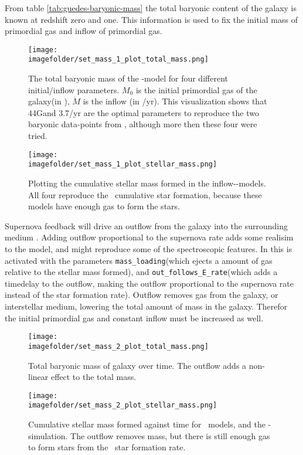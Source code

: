 
From table \ref{tab:guedes-baryonic-mass} the total baryonic content of the galaxy is known at redshift zero and one. This information is used to fix the initial mass of primordial gas and inflow of primordial gas. 


\begin{figure}[h]
  \centering
  \texttt{[image: \\imagefolder/set\_mass\_1\_plot\_total\_mass.png]}
  \caption{\label{fig:fit-v1-1-total}
    The total baryonic mass of the \omegamodel-model for four different initial/inflow parameters.
    $M_0$ is the initial primordial gas of the galaxy(in \msol), $\dot{M}$ is the inflow (in \msol/yr).
    This visualization shows that 44G\msol and 3.7\msol/yr are the optimal parameters to reproduce the two baryonic data-points from \eris, although more then these four were tried.
  }
\end{figure}
\begin{figure}[h]
  \centering
  \texttt{[image: \\imagefolder/set\_mass\_1\_plot\_stellar\_mass.png]}
  \caption{\label{fig:fit-v1-1-stellar}
    Plotting the cumulative stellar mass formed in the inflow-\omegamodel-models. All four reproduce the \eris\ cumulative star formation, because these models have enough gas to form the stars.
  }
\end{figure}

Supernova feedback will drive an outflow from the galaxy into the surrounding medium . Adding outflow proportional to the supernova rate adds some realisim to the model, and might reproduce some of the spectroscopic features.
In \omegamodel this is activated with the parameters \verb|mass_loading|(which ejects a amount of gas relative to the stellar mass formed), and \verb|out_follows_E_rate|(which adds a timedelay to the outflow, making the outflow proportional to the supernova rate instead of the star formation rate).
Outflow removes gas from the galaxy, or interstellar medium, lowering the total amount of mass in the galaxy. Therefor the initial primordial gas and constant inflow must be increased as well.

\begin{figure}[h]
  \centering
  \texttt{[image: \\imagefolder/set\_mass\_2\_plot\_total\_mass.png]}
  \caption{\label{fig:fit-v1-2-total}
    Total baryonic mass of galaxy over time.
    The outflow adds a non-linear effect to the total mass.
  }
\end{figure}
\begin{figure}[h]
  \centering
  \texttt{[image: \\imagefolder/set\_mass\_2\_plot\_stellar\_mass.png]}
  \caption{\label{fig:fit-v1-2-stellar}
    Cumulative stellar mass formed against time for  \omegamodel\ models, and the \eris-simulation.
    The outflow removes mass, but there is still enough gas to form stars from the \eris\ star formation rate.
  }
\end{figure}

